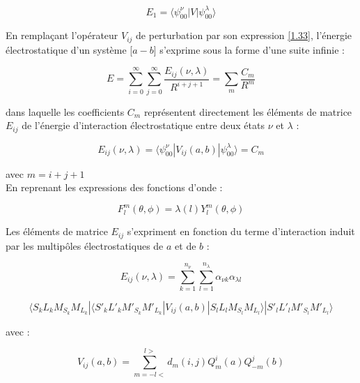 	\begin{equation}
	E_{1} = \langle \psi_{00}^{\nu}|V| \psi_{00}^{\lambda}\rangle
	\end{equation}
	
	
	En remplaçant l'opérateur $V_{ij}$ de perturbation par son expression \ref{1.33}, l'énergie électrostatique d'un système [$a-b$] s'exprime sous la forme d'une suite infinie : 
	
	\begin{equation}
	E = \sum_{i=0}^{\infty} \sum_{j=0}^{\infty} \frac{E_{ij} (\nu,\lambda)}{R^{i+j+1}} = \sum_{m} \frac{C_{m}}{R^{m}}
	\end{equation}
	
	\noindent dans laquelle les coefficients $C_{m}$ représentent directement les éléments de matrice $E_{ij}$ de l'énergie d'interaction électrostatique entre deux états $\nu$ et $\lambda$ : 
	
	\begin{equation}
	E_{ij}(\nu, \lambda) = \langle \psi_{00}^{\nu}|V_{ij}(a,b)|\psi_{00}^{\lambda} \rangle = C_{m}
	\end{equation}
	
	\noindent avec $m= i+j+1$ \\
	En reprenant les expressions des fonctions d'onde :
	
	\begin{equation}
	F_{l}^{m} (\theta,\phi) = \lambda (l)Y_{l}^{m} (\theta,\phi)
	\end{equation}
	
	Les éléments de matrice $E_{ij}$ s'expriment en fonction du terme d'interaction induit par les multipôles électrostatiques de $a$ et de $b$ : 
	
	\begin{equation*}
	E_{ij} (\nu , \lambda) = \sum_{k=1}^{n_{\nu}} \sum_{l=1}^{n_{\lambda}} \alpha_{\nu k} \alpha_{\lambda l}
	\end{equation*}
	
	\begin{equation}
	\langle S_{k}L_{k}M_{S_{k}}M_{L_{k}}|\langle S'_{k}L'_{k}M'_{S_{k}}M'_{L_{k}}| V_{ij}(a,b)| S_{l}L_{l}M_{S_{l}} M_{L_{l}} \rangle| S'_{l}L'_{l}M'_{S_{l}}M'_{L_{l}} \rangle
	\end{equation}
	
	\noindent avec : 
	
	\begin{equation}
	V_{ij}(a,b) = \sum_{m=-l<}^{l>} d_{m}(i,j) Q_{m}^{i}(a) Q_{-m}^{j}(b) 
	\end{equation}
	
